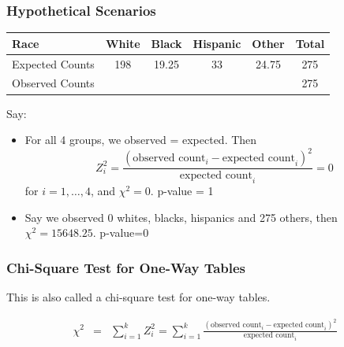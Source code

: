 \documentclass[handout]{beamer}
\newcommand{\blue}[1]{\textcolor{blue2}{#1}}
\begin{document}
\begin{frame}[fragile]
\frametitle{Hypothetical Scenarios}
\begin{center}
\begin{tabular}{l||cccc|c}
Race & White & Black & Hispanic & Other & Total \\ 
\hline
Expected Counts & 198 & 19.25 & 33 & 24.75 & 275\\ 
Observed Counts &  &  &  &  & 275 \\ 
\end{tabular}
\end{center}

\pause Say:
\begin{itemize}
\item For all 4 groups, we observed = expected.  Then
\[
Z_i^2=\frac{(\mbox{observed count}_i - \mbox{expected count}_i)^2}{\mbox{expected count}_i} = 0
\]
for $i=1,\ldots,4$, and $\chi^2=0$.  p-value = 1
\pause\item Say we observed 0 whites, blacks, hispanics and 275 others, then $\chi^2=15648.25$.  p-value=0
\end{itemize}

\end{frame}


\begin{frame}[fragile]
\frametitle{Chi-Square Test for One-Way Tables}
This is also called a \blue{chi-square test for one-way tables}.  

\begin{eqnarray*}
\chi^2 &=& \sum_{i=1}^k Z_i^2 = \sum_{i=1}^k \frac{(\mbox{observed count}_i - \mbox{expected count}_i)^2}{\mbox{expected count}_i}\\
\end{eqnarray*}

\end{frame}
\end{document}
